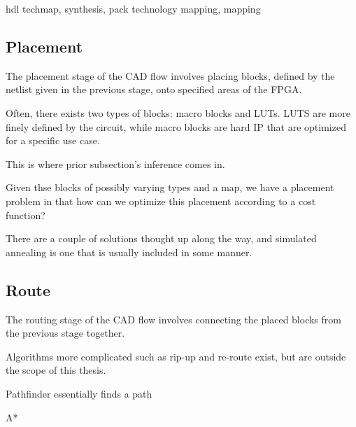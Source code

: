 hdl techmap, synthesis, pack
technology mapping, mapping



\subsection{Placement}
\label{bg:place}

The placement stage of the CAD flow involves placing blocks, defined by the netlist given in the previous stage, onto specified areas of the FPGA. 

Often, there exists two types of blocks: macro blocks and LUTs. LUTS are more finely defined by the circuit, while macro blocks are hard IP that are optimized for a specific use case.

This is where prior subsection's inference comes in. 

Given thse blocks of possibly varying types and a map, we have a placement problem in that how can we optimize this placement according to a cost function?

There are a couple of solutions thought up along the way, and simulated annealing is one that is usually included in some manner. 





\subsection{Route}
\label{bg:route}

The routing stage of the CAD flow involves connecting the placed blocks from the previous stage together.

Algorithms more complicated such as rip-up and re-route exist, but are outside the scope of this thesis.

Pathfinder essentially finds a path

A*

